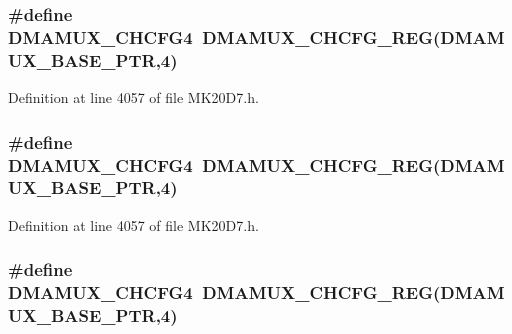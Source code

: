 \subsubsection[{\texorpdfstring{D\+M\+A\+M\+U\+X\+\_\+\+C\+H\+C\+F\+G4}{DMAMUX_CHCFG4}}]{\setlength{\rightskip}{0pt plus 5cm}\#define D\+M\+A\+M\+U\+X\+\_\+\+C\+H\+C\+F\+G4~{\bf D\+M\+A\+M\+U\+X\+\_\+\+C\+H\+C\+F\+G\+\_\+\+R\+EG}({\bf D\+M\+A\+M\+U\+X\+\_\+\+B\+A\+S\+E\+\_\+\+P\+TR},4)}\hypertarget{group___d_m_a_m_u_x___register___accessor___macros_ga53ff670480726d3532078167c90eacb9}{}\label{group___d_m_a_m_u_x___register___accessor___macros_ga53ff670480726d3532078167c90eacb9}


Definition at line 4057 of file M\+K20\+D7.\+h.

\subsubsection[{\texorpdfstring{D\+M\+A\+M\+U\+X\+\_\+\+C\+H\+C\+F\+G4}{DMAMUX_CHCFG4}}]{\setlength{\rightskip}{0pt plus 5cm}\#define D\+M\+A\+M\+U\+X\+\_\+\+C\+H\+C\+F\+G4~{\bf D\+M\+A\+M\+U\+X\+\_\+\+C\+H\+C\+F\+G\+\_\+\+R\+EG}({\bf D\+M\+A\+M\+U\+X\+\_\+\+B\+A\+S\+E\+\_\+\+P\+TR},4)}\hypertarget{group___d_m_a_m_u_x___register___accessor___macros_ga53ff670480726d3532078167c90eacb9}{}\label{group___d_m_a_m_u_x___register___accessor___macros_ga53ff670480726d3532078167c90eacb9}


Definition at line 4057 of file M\+K20\+D7.\+h.

\subsubsection[{\texorpdfstring{D\+M\+A\+M\+U\+X\+\_\+\+C\+H\+C\+F\+G4}{DMAMUX_CHCFG4}}]{\setlength{\rightskip}{0pt plus 5cm}\#define D\+M\+A\+M\+U\+X\+\_\+\+C\+H\+C\+F\+G4~{\bf D\+M\+A\+M\+U\+X\+\_\+\+C\+H\+C\+F\+G\+\_\+\+R\+EG}({\bf D\+M\+A\+M\+U\+X\+\_\+\+B\+A\+S\+E\+\_\+\+P\+TR},4)}\hypertarget{group___d_m_a_m_u_x___register___accessor___macros_ga53ff670480726d3532078167c90eacb9}{}\label{group___d_m_a_m_u_x___register___accessor___macros_ga53ff670480726d3532078167c90eacb9}


